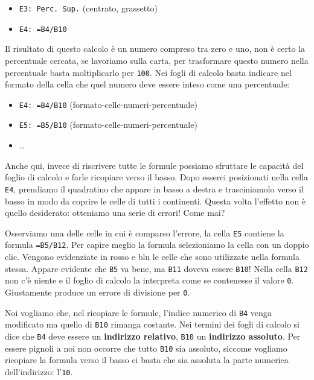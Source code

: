\begin{itemize} [noitemsep]
\item \texttt{E3: Perc. Sup.} (centrato, grassetto)
\item \texttt{E4: =B4/B10}
\end{itemize}

Il risultato di questo calcolo è un numero compreso tra zero e uno,
non è certo la percentuale cercata,
se lavoriamo sulla carta, per trasformare questo numero nella percentuale
basta moltiplicarlo per \texttt{100}. Nei fogli di calcolo basta indicare nel
formato della cella che quel numero deve essere inteso come una percentuale:

\begin{itemize} [noitemsep]
\item \texttt{E4: =B4/B10}
(formato-celle-numeri-percentuale)
\item \texttt{E5: =B5/B10}
(formato-celle-numeri-percentuale)
\item \dots
\end{itemize}

Anche qui, invece di riscrivere tutte le formule possiamo sfruttare le
capacità del foglio di calcolo e farle ricopiare verso il basso.
Dopo esserci posizionati nella cella \texttt{E4}, prendiamo il quadratino che
appare in basso a destra e trasciniamolo verso il basso in modo da coprire
le celle di tutti i continenti.
Questa volta l'effetto non è quello desiderato:
otteniamo una serie di errori! Come mai?

Osserviamo una delle celle in cui è comparso l'errore, la cella
\texttt{E5} contiene la formula \texttt{=B5/B12}.
Per capire meglio la formula selezioniamo la cella con un doppio clic.
Vengono evidenziate in rosso e blu le celle che sono utilizzate nella formula
stessa.
Appare evidente che \texttt{B5} va bene, ma \texttt{B11} doveva essere 
\texttt{B10}!
Nella cella \texttt{B12} non c'è niente e il foglio di calcolo la interpreta
come se contenesse il valore \texttt{0}.
Giustamente produce un errore di divisione per \texttt{0}.

Noi vogliamo che, nel ricopiare le formule, l'indice numerico di \texttt{B4} 
venga
modificato ma quello di \texttt{B10} rimanga costante.
Nei termini dei fogli di calcolo si dice che \texttt{B4} deve essere un
\textbf{indirizzo relativo}, \texttt{B10} un \textbf{indirizzo assoluto}.
Per essere pignoli a noi non occorre che tutto \texttt{B10} sia assoluto,
siccome vogliamo ricopiare la formula verso il basso ci basta che sia
assoluta la parte numerica dell'indirizzo: l'\texttt{10}.

